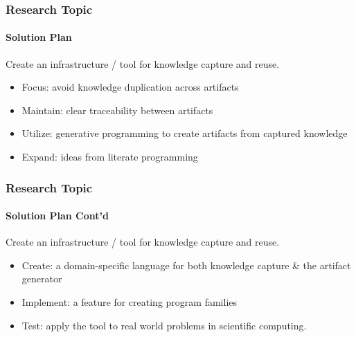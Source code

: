 \documentclass{beamer}
\begin{document}




\begin{frame}

\frametitle{Research Topic}
\framesubtitle{Solution Plan}

Create an infrastructure / tool for knowledge capture and reuse.

\begin{itemize}
\item Focus: avoid knowledge duplication across artifacts %
\item Maintain: clear traceability between artifacts
\item Utilize: generative programming to create artifacts from captured
	knowledge
\item Expand: ideas from literate programming

\end{itemize}
\end{frame}



\begin{frame}

\frametitle{Research Topic}
\framesubtitle{Solution Plan Cont'd}

Create an infrastructure / tool for knowledge capture and reuse.

\begin{itemize}
\item Create: a domain-specific language for both knowledge capture \& the 
	artifact	generator
\item Implement: a feature for creating program families
\item Test: apply the tool to real world problems in scientific computing.

\end{itemize}
\end{frame}
\end{document}
